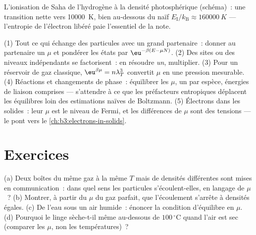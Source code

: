 \begin{omfigure}

{\small L'ionisation de Saha de l'hydrogène à la densité
photosphérique (schéma)~: une transition nette vers \qty{10000}{K},
bien au-dessous du naïf
$E_{\text{I}}/k_{\text{B}} \approx \qty{160000}{K}$ --- l'entropie de
l'électron libéré paie l'essentiel de la note.}
\end{omfigure}

\begin{method}\label{met:b3:grand-canonical:method}
(1) Tout ce qui échange des particules avec un grand partenaire~:
donner au partenaire un $\mu$ et pondérer les états par
$\eu^{-\beta(E - \mu N)}$. (2) Des sites ou des niveaux indépendants
se factorisent~: en résoudre \emph{un}, multiplier. (3) Pour un
réservoir de gaz classique, $\eu^{\beta\mu} =
n\lambda_T^3$ convertit $\mu$ en une pression mesurable. (4) Réactions et changements de
phase~: équilibrer les $\mu$, un par espèce, énergies de liaison
comprises --- s'attendre à ce que les préfacteurs entropiques
déplacent les équilibres loin des estimations naïves de Boltzmann. (5)
Électrons dans les solides~: leur $\mu$ est le niveau de Fermi, et les
différences de $\mu$ sont des tensions --- le pont vers le
\cref{ch:b3:electrons-in-solids}.
\end{method}

\section{Exercices}

\begin{exercise}[$\star$]\label{exo:b3:grand-canonical:1}
(a) Deux boîtes du même gaz à la même $T$ mais de densités
différentes sont mises en communication~: dans quel sens les
particules s'écoulent-elles, en langage de $\mu$~? (b) Montrer, à
partir du $\mu$ du gaz parfait, que l'écoulement s'arrête à densités
égales. (c) De l'eau sous un air humide~: énoncer la condition
d'équilibre en $\mu$. (d) Pourquoi le linge sèche-t-il même
au-dessous de $100\,^\circ$C quand l'air est sec (comparer les $\mu$,
non les températures)~?
\end{exercise}


